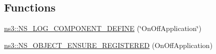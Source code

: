 \subsection*{Functions}
\begin{DoxyCompactItemize}
\item 
\hyperlink{namespacens3_af31cd9e11b1dcce59ca4beea3b3193a5}{ns3\+::\+N\+S\+\_\+\+L\+O\+G\+\_\+\+C\+O\+M\+P\+O\+N\+E\+N\+T\+\_\+\+D\+E\+F\+I\+NE} (\char`\"{}On\+Off\+Application\char`\"{})
\item 
\hyperlink{namespacens3_a114249fa2b202391374b8559f8756222}{ns3\+::\+N\+S\+\_\+\+O\+B\+J\+E\+C\+T\+\_\+\+E\+N\+S\+U\+R\+E\+\_\+\+R\+E\+G\+I\+S\+T\+E\+R\+ED} (On\+Off\+Application)
\end{DoxyCompactItemize}
